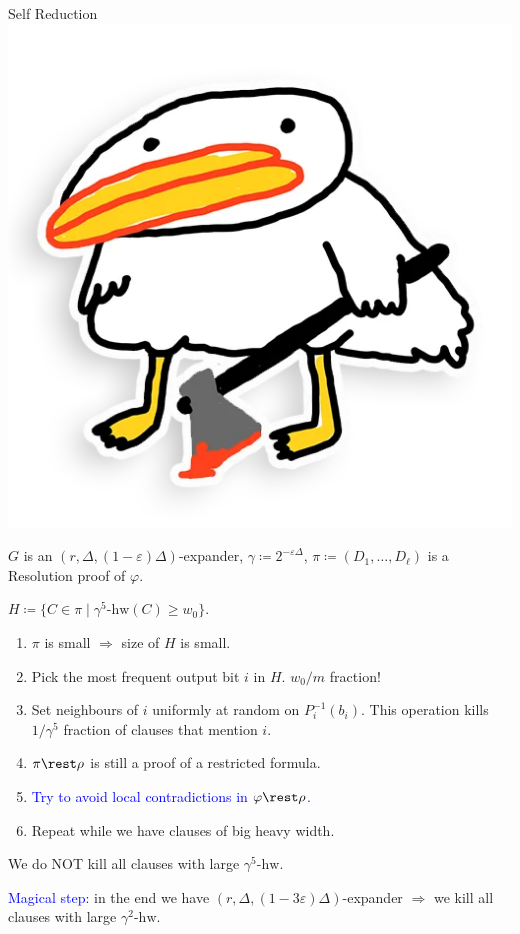 \begin{frame}{Self Reduction \hspace{0.2cm} \includegraphics[scale = 0.03]{pics/utia-blood.png}}

    $G$ is an $(r, \Delta, (1 - \varepsilon) \Delta)$-expander, $\gamma \coloneqq 2^{-\varepsilon \Delta}$,
    $\pi \coloneqq (D_1, \dots, D_{\ell})$ is a Resolution proof of $\varphi$.

    $H \coloneqq \{C \in \pi \mid \gamma^5\text{-}\mathrm{hw}(C) \ge w_0 \}$.

    \begin{enumerate}
        \item $\pi$ is small $\Rightarrow$ size of $H$ is small.
        \pause
        \item Pick the most frequent output bit $i$ in $H$. \alert{$w_0 / m$ fraction!}
        \pause
        \item Set \alert{neighbours} of $i$ uniformly at random on $P_i^{-1}(b_i)$. This
            operation kills \alert{$1 / \gamma^5$ fraction} of clauses that mention $i$.
        \pause
        \item $\pi \rest \rho$ is still a proof of a restricted formula.
        \pause
        \item \textcolor{blue}{Try to avoid local contradictions in $\varphi \rest \rho$.}
        \pause    
        \item Repeat while we have clauses of big \alert{heavy width}.
    \end{enumerate}

    \pause
    \vspace{0.3cm}
    We do NOT kill all clauses with large $\gamma^5\text{-}\mathrm{hw}$.

    \vspace{0.3cm}
    \pause
    \textcolor{blue}{Magical step}: in the end we have $(r, \Delta, (1 - 3 \varepsilon) \Delta)$-expander
    $\Rightarrow$ we kill all clauses with large $\gamma^2\text{-}\mathrm{hw}$.
\end{frame}


